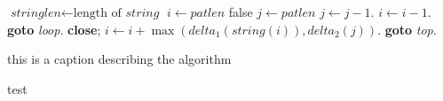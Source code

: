 \begin{algorithm}
    \begin{algorithmic}[1]
            \State $\textit{stringlen} \gets \text{length of }\textit{string}$
            \State $i \gets \textit{patlen}$
             \Return false
            \EndIf
            \State $j \gets \textit{patlen}$
            \State $j \gets j-1$.
            \State $i \gets i-1$.
            \State \textbf{goto} \emph{loop}.
            \State \textbf{close};
            \EndIf
            \State $i \gets i+\max(\textit{delta}_1(\textit{string}(i)),\textit{delta}_2(j))$.
            \State \textbf{goto} \emph{top}.
            \EndProcedure
    \end{algorithmic}
    \caption[Pseudocode for Simulation Algorithm]{this is a caption describing the algorithm}\label{alg:sim}
\end{algorithm}

test

